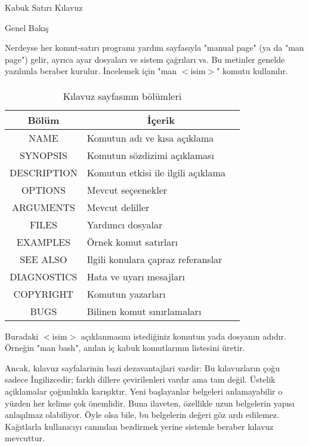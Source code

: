 \begin{section}{Kabuk Satırı Kılavuz}
\begin{subsection}{Genel Bakış}

Nerdeyse her komut-satırı programı yardım sayfasıyla "manual page" (ya da "man page") gelir, ayrıca ayar dosyaları ve sistem çağrıları vs. Bu metinler 
genelde yazılımla beraber kurulur. İncelemek için "man $<$isim$>$" komutu kullanılır.

\paragraph{}{
\begin {table}[H]
\caption {Kılavuz sayfasının bölümleri} \label{tab:title} 
\begin{tabular}{c l @{} l}
\hline
Bölüm &
\multicolumn{2}{c}{İçerik} \\
\hline
NAME 	&	Komutun adı ve kısa açıklama \\
SYNOPSIS &	Komutun sözdizimi açıklaması \\
DESCRIPTION &	Komutun etkisi ile ilgili açıklama \\
OPTIONS &	Mevcut seçeenekler \\
ARGUMENTS &	Mevcut deliller \\
FILES 	&	Yardımcı dosyalar \\
EXAMPLES &	Örnek komut satırları \\
SEE ALSO &	Ilgili konulara çapraz referanslar \\
DIAGNOSTICS &	Hata ve uyarı mesajları \\
COPYRIGHT & 	Komutun yazarları \\
BUGS	&	Bilinen komut sınırlamaları \\
\hline
\end{tabular}
\end {table}
}

Buradaki $<$isim$>$ açıklanmasını istediğiniz komutun yada dosyanın adıdır. Örneğin "man bash", anılan iç kabuk komutlarının listesini üretir.

Ancak, kılavuz sayfalarinin bazi dezavantajlari vardir: Bu kılavuzların çoğu sadece İngilizcedir; farklı dillere çevirilenleri vardır ama tam değil. Üstelik açiklamalar çoğunlukla karışıktır. Yeni başlayanlar belgeleri anlamayabilir o yüzden her kelime çok önemlidir. Buna ilaveten, özellikle uzun belgelerin yapısı anlaşılmaz olabiliyor. Öyle olsa bile, bu belgelerin değeri göz ardı edilemez. Kağıtlarla kullanıcıyı canından bezdirmek yerine sistemle beraber kılavuz mevcuttur.


\end{subsection}
\end{section}
